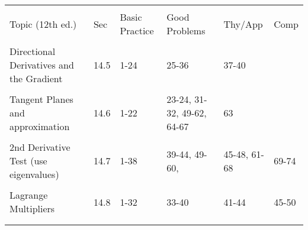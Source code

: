 \documentclass[10pt,]{book}
\theoremstyle{plain}
\theoremstyle{definition}
\theoremstyle{definition}
\theoremstyle{definition}
\theoremstyle{definition}
\theoremstyle{definition}
\numberwithin{equation}{section}
\newcommand{\hrulethin}  {\noalign{\hrule height 0.04em}}
\begin{document}
\begin{tabular}{llllll}
&&&&&\tabularnewline\hrulethin
Topic (12th ed.)&Sec&Basic Practice&Good Problems&Thy/App&Comp\tabularnewline[0pt]
&&&&&\tabularnewline\hrulethin
Directional Derivatives and the Gradient&14.5&1-24&25-36&37-40&\tabularnewline[0pt]
&&&&&\tabularnewline\hrulethin
Tangent Planes and approximation&14.6&1-22&23-24, 31-32, 49-62, 64-67&63&\tabularnewline[0pt]
&&&&&\tabularnewline\hrulethin
2nd Derivative Test (use eigenvalues)&14.7&1-38&39-44, 49-60,&45-48, 61-68&69-74\tabularnewline[0pt]
&&&&&\tabularnewline\hrulethin
Lagrange Multipliers&14.8&1-32&33-40&41-44&45-50\tabularnewline[0pt]
&&&&&\tabularnewline\hrulethin
\end{tabular}
\typeout{************************************************}
\typeout{************************************************}
\end{document}
